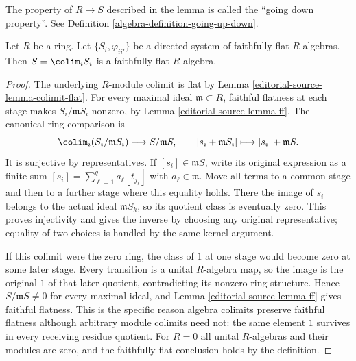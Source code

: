 \noindent
The property of $R \to S$ described in the lemma is called the
``going down property''. See Definition \ref{algebra-definition-going-up-down}.

\begin{lemma}
\label{editorial-source-lemma-colimit-faithfully-flat}
Let $R$ be a ring. Let $\{S_i, \varphi_{ii'}\}$ be a directed system of
faithfully flat $R$-algebras. Then $S = \colim_i S_i$ is a faithfully flat
$R$-algebra.
\end{lemma}

\begin{proof}
The underlying $R$-module colimit is flat by
Lemma \ref{editorial-source-lemma-colimit-flat}. For every maximal ideal
$\mathfrak m\subset R$, faithful flatness at each stage
makes $S_i/\mathfrak mS_i$ nonzero, by Lemma \ref{editorial-source-lemma-ff}.
The canonical ring comparison is
$$
\colim_i(S_i/\mathfrak mS_i)\longrightarrow S/\mathfrak mS,
\qquad [s_i+\mathfrak mS_i]\longmapsto[s_i]+\mathfrak mS.
$$
It is surjective by representatives. If $[s_i]\in\mathfrak mS$,
write its original expression as a finite sum
$[s_i]=\sum_{\ell=1}^q a_\ell[t_{j_\ell}]$ with
$a_\ell\in\mathfrak m$. Move all terms to a common stage
and then to a further stage where this equality holds.
There the image of $s_i$ belongs to the actual ideal
$\mathfrak mS_k$, so its quotient class is eventually zero.
This proves injectivity and gives the inverse by choosing
any original representative; equality of two choices is
handled by the same kernel argument.

If this colimit were the zero ring, the class of $1$ at
one stage would become zero at some later stage. Every
transition is a unital $R$-algebra map, so the image is
the original $1$ of that later quotient, contradicting
its nonzero ring structure. Hence $S/\mathfrak mS\ne0$
for every maximal ideal, and Lemma \ref{editorial-source-lemma-ff} gives
faithful flatness. This is the specific reason algebra
colimits preserve faithful flatness although arbitrary
module colimits need not: the same element $1$ survives
in every receiving residue quotient. For $R=0$ all
unital $R$-algebras and their modules are zero, and the
faithfully-flat conclusion holds by the definition.
\end{proof}





